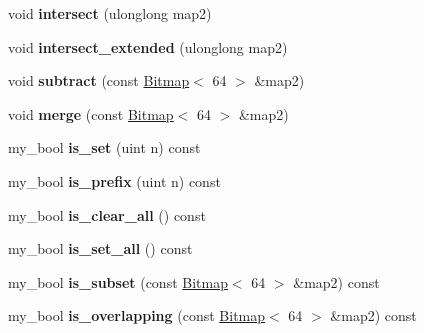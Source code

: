 \begin{DoxyCompactItemize}
\item 
\mbox{\label{classBitmap_3_0164_01_4_a706fca0b31c247dbdd2c45e254f0320f}} 
void {\bfseries intersect} (ulonglong map2)
\item 
\mbox{\label{classBitmap_3_0164_01_4_a996a34fff232adeb9ad45a17ff1a188c}} 
void {\bfseries intersect\+\_\+extended} (ulonglong map2)
\item 
\mbox{\label{classBitmap_3_0164_01_4_ae0f8f461a1b3668a2862a8bf821c304e}} 
void {\bfseries subtract} (const \mbox{\hyperlink{classBitmap}{Bitmap}}$<$ 64 $>$ \&map2)
\item 
\mbox{\label{classBitmap_3_0164_01_4_ab3b4b104ac285ce3298f0702ed795fb7}} 
void {\bfseries merge} (const \mbox{\hyperlink{classBitmap}{Bitmap}}$<$ 64 $>$ \&map2)
\item 
\mbox{\label{classBitmap_3_0164_01_4_a144160921cd2801831cdaa6c362fcf45}} 
my\+\_\+bool {\bfseries is\+\_\+set} (uint n) const
\item 
\mbox{\label{classBitmap_3_0164_01_4_a5250a450b1672e154215fb8c3b5cb1d4}} 
my\+\_\+bool {\bfseries is\+\_\+prefix} (uint n) const
\item 
\mbox{\label{classBitmap_3_0164_01_4_ae5d89ac1aa000143dde120a6f2696eaa}} 
my\+\_\+bool {\bfseries is\+\_\+clear\+\_\+all} () const
\item 
\mbox{\label{classBitmap_3_0164_01_4_a1c2c31167def5e52fb35833317f15c64}} 
my\+\_\+bool {\bfseries is\+\_\+set\+\_\+all} () const
\item 
\mbox{\label{classBitmap_3_0164_01_4_a29bc31507fe45b5ad7854b94dcf260e2}} 
my\+\_\+bool {\bfseries is\+\_\+subset} (const \mbox{\hyperlink{classBitmap}{Bitmap}}$<$ 64 $>$ \&map2) const
\item 
\mbox{\label{classBitmap_3_0164_01_4_a5e306f69cf9fa53c0ba81c3c1e5593f4}} 
my\+\_\+bool {\bfseries is\+\_\+overlapping} (const \mbox{\hyperlink{classBitmap}{Bitmap}}$<$ 64 $>$ \&map2) const

\end{DoxyCompactItemize}
